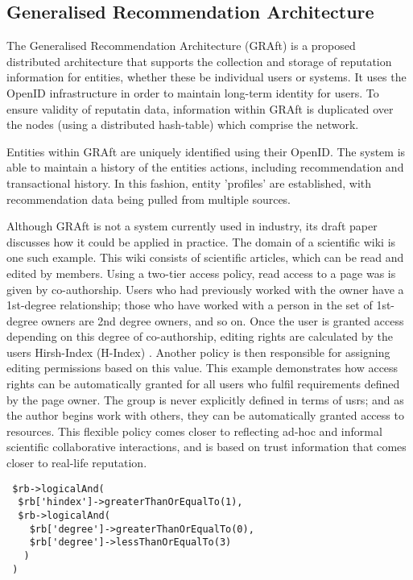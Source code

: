 \subsection{Generalised Recommendation Architecture}

The Generalised Recommendation Architecture (GRAft) \cite{} is a proposed distributed architecture that supports the collection and storage of reputation information for entities, whether these be individual users or systems. It uses the OpenID \cite{} infrastructure in order to maintain long-term identity for users. To ensure validity of reputatin data, information within GRAft is duplicated over the nodes (using a distributed hash-table) which comprise the network. 

Entities within GRAft are uniquely identified using their OpenID. The system is able to maintain a history of the entities actions, including recommendation and transactional history. In this fashion, entity 'profiles' are established, with recommendation data being pulled from multiple sources.



Although GRAft is not a system currently used in industry, its draft paper discusses how it could be applied in practice. The domain of a scientific wiki is one such example. This wiki consists of scientific articles, which can be read and edited by members. Using a two-tier access policy, read access to a page was is given by co-authorship. Users who had previously worked with the owner have a 1st-degree relationship; those who have worked with a person in the set of 1st-degree owners are 2nd degree owners, and so on. Once the user is granted access depending on this degree of co-authorship, editing rights are calculated by the users Hirsh-Index (H-Index) \cite{}. Another policy is then responsible for assigning editing permissions based on this value. This example demonstrates how access rights can be automatically granted for all users who fulfil requirements defined by the page owner. The group is never explicitly defined in terms of usrs; and as the author begins work with others, they can be 
automatically granted access to resources. This flexible policy comes closer to reflecting ad-hoc and informal scientific collaborative interactions, and is based on trust information that comes closer to real-life reputation. 

\begin{verbatim}
 $rb->logicalAnd(
  $rb['hindex']->greaterThanOrEqualTo(1),
  $rb->logicalAnd(
    $rb['degree']->greaterThanOrEqualTo(0),
    $rb['degree']->lessThanOrEqualTo(3)
   )
 )
\end{verbatim}


